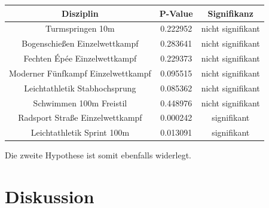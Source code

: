 \documentclass[11pt]{article}
\begin{document}
\begin{tabular}{ c|c|c }
  Disziplin & P-Value & Signifikanz \\
  \hline
  Turmspringen 10m & 0.222952 & nicht signifikant \\
  Bogenschießen Einzelwettkampf & 0.283641 & nicht signifikant \\
  Fechten Épée Einzelwettkampf & 0.229373 & nicht signifikant \\
  Moderner Fünfkampf Einzelwettkampf & 0.095515 & nicht signifikant \\
  Leichtathletik Stabhochsprung & 0.085362 & nicht signifikant \\
  Schwimmen 100m Freistil & 0.448976 & nicht signifikant \\
  Radsport Straße Einzelwettkampf & 0.000242 & signifikant \\
  Leichtathletik Sprint 100m & 0.013091 & signifikant \\
\end{tabular}

Die zweite Hypothese ist somit ebenfalls widerlegt. 


\section {Diskussion}

\printbibliography
\end{document}
